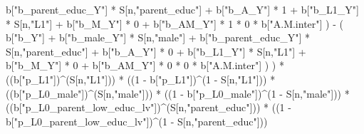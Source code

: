 \documentclass[
]{book}
\newenvironment{Shaded}{\begin{snugshade}}{\end{snugshade}}
\newcommand{\DecValTok}[1]{\textcolor[rgb]{0.00,0.00,0.81}{#1}}
\newcommand{\NormalTok}[1]{#1}
\newcommand{\SpecialCharTok}[1]{\textcolor[rgb]{0.00,0.00,0.00}{#1}}
\newcommand{\StringTok}[1]{\textcolor[rgb]{0.31,0.60,0.02}{#1}}
\begin{document}
\begin{Shaded}
\begin{Highlighting}[]
\NormalTok{                            b[}\StringTok{"b\_parent\_educ\_Y"}\NormalTok{] }\SpecialCharTok{*}\NormalTok{ S[n,}\StringTok{"parent\_educ"}\NormalTok{] }\SpecialCharTok{+} 
\NormalTok{                            b[}\StringTok{"b\_A\_Y"}\NormalTok{] }\SpecialCharTok{*} \DecValTok{1} \SpecialCharTok{+} 
\NormalTok{                            b[}\StringTok{"b\_L1\_Y"}\NormalTok{] }\SpecialCharTok{*}\NormalTok{ S[n,}\StringTok{"L1"}\NormalTok{] }\SpecialCharTok{+}
\NormalTok{                            b[}\StringTok{"b\_M\_Y"}\NormalTok{] }\SpecialCharTok{*} \DecValTok{0} \SpecialCharTok{+}
\NormalTok{                            b[}\StringTok{"b\_AM\_Y"}\NormalTok{] }\SpecialCharTok{*} \DecValTok{1} \SpecialCharTok{*} \DecValTok{0} \SpecialCharTok{*}\NormalTok{ b[}\StringTok{"A.M.inter"}\NormalTok{] ) }\SpecialCharTok{{-}} 
\NormalTok{                          ( b[}\StringTok{"b\_Y"}\NormalTok{] }\SpecialCharTok{+} 
\NormalTok{                              b[}\StringTok{"b\_male\_Y"}\NormalTok{] }\SpecialCharTok{*}\NormalTok{ S[n,}\StringTok{"male"}\NormalTok{] }\SpecialCharTok{+} 
\NormalTok{                              b[}\StringTok{"b\_parent\_educ\_Y"}\NormalTok{] }\SpecialCharTok{*}\NormalTok{ S[n,}\StringTok{"parent\_educ"}\NormalTok{] }\SpecialCharTok{+} 
\NormalTok{                              b[}\StringTok{"b\_A\_Y"}\NormalTok{] }\SpecialCharTok{*} \DecValTok{0} \SpecialCharTok{+} 
\NormalTok{                              b[}\StringTok{"b\_L1\_Y"}\NormalTok{] }\SpecialCharTok{*}\NormalTok{ S[n,}\StringTok{"L1"}\NormalTok{] }\SpecialCharTok{+}
\NormalTok{                              b[}\StringTok{"b\_M\_Y"}\NormalTok{] }\SpecialCharTok{*} \DecValTok{0} \SpecialCharTok{+}
\NormalTok{                              b[}\StringTok{"b\_AM\_Y"}\NormalTok{] }\SpecialCharTok{*} \DecValTok{0} \SpecialCharTok{*} \DecValTok{0} \SpecialCharTok{*}\NormalTok{ b[}\StringTok{"A.M.inter"}\NormalTok{] ) ) }\SpecialCharTok{*}
\NormalTok{      ((b[}\StringTok{"p\_L1"}\NormalTok{])}\SpecialCharTok{\^{}}\NormalTok{(S[n,}\StringTok{"L1"}\NormalTok{])) }\SpecialCharTok{*}
\NormalTok{      ((}\DecValTok{1} \SpecialCharTok{{-}}\NormalTok{ b[}\StringTok{"p\_L1"}\NormalTok{])}\SpecialCharTok{\^{}}\NormalTok{(}\DecValTok{1} \SpecialCharTok{{-}}\NormalTok{ S[n,}\StringTok{"L1"}\NormalTok{])) }\SpecialCharTok{*}
\NormalTok{      ((b[}\StringTok{"p\_L0\_male"}\NormalTok{])}\SpecialCharTok{\^{}}\NormalTok{(S[n,}\StringTok{"male"}\NormalTok{])) }\SpecialCharTok{*} 
\NormalTok{      ((}\DecValTok{1} \SpecialCharTok{{-}}\NormalTok{ b[}\StringTok{"p\_L0\_male"}\NormalTok{])}\SpecialCharTok{\^{}}\NormalTok{(}\DecValTok{1} \SpecialCharTok{{-}}\NormalTok{ S[n,}\StringTok{"male"}\NormalTok{])) }\SpecialCharTok{*} 
\NormalTok{      ((b[}\StringTok{"p\_L0\_parent\_low\_educ\_lv"}\NormalTok{])}\SpecialCharTok{\^{}}\NormalTok{(S[n,}\StringTok{"parent\_educ"}\NormalTok{])) }\SpecialCharTok{*}
\NormalTok{      ((}\DecValTok{1} \SpecialCharTok{{-}}\NormalTok{ b[}\StringTok{"p\_L0\_parent\_low\_educ\_lv"}\NormalTok{])}\SpecialCharTok{\^{}}\NormalTok{(}\DecValTok{1} \SpecialCharTok{{-}}\NormalTok{ S[n,}\StringTok{"parent\_educ"}\NormalTok{])) }
    

\end{Highlighting}
\end{Shaded}
\end{document}
